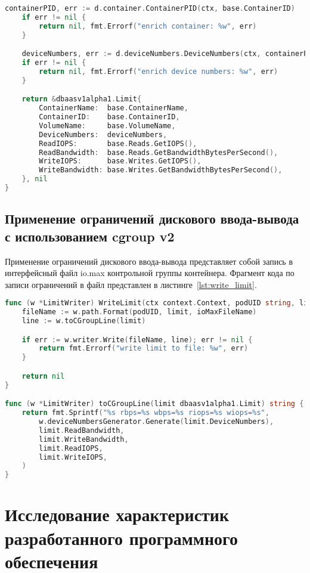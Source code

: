 \begin{lstlisting}[language=Go,label=lst:podiolimit_gen, caption={Генерация PodIOLimit}]
	containerPID, err := d.container.ContainerPID(ctx, base.ContainerID)
	if err != nil {
		return nil, fmt.Errorf("enrich container: %w", err)
	}

	deviceNumbers, err := d.deviceNumbers.DeviceNumbers(ctx, containerPID, volumeHandle)
	if err != nil {
		return nil, fmt.Errorf("enrich device numbers: %w", err)
	}

	return &dbaasv1alpha1.Limit{
		ContainerName:  base.ContainerName,
		ContainerID:    base.ContainerID,
		VolumeName:     base.VolumeName,
		DeviceNumbers:  deviceNumbers,
		ReadIOPS:       base.Reads.GetIOPS(),
		ReadBandwidth:  base.Reads.GetBandwidthBytesPerSecond(),
		WriteIOPS:      base.Writes.GetIOPS(),
		WriteBandwidth: base.Writes.GetBandwidthBytesPerSecond(),
	}, nil
}
\end{lstlisting}

\subsection{Применение ограничений дискового ввода-вывода с использованием cgroup v2}

Применение ограничений дискового ввода-вывода представляет собой запись в интерфейсный файл io.max контрольной группы контейнера. Фрагмент кода по записи ограничений в файл представлен в листинге~\ref{lst:write_limit}.

\begin{lstlisting}[language=Go,label=lst:write_limit, caption={Запись ограничений в cgroup v2}]
func (w *LimitWriter) WriteLimit(ctx context.Context, podUID string, limit dbaasv1alpha1.Limit) error {
	fileName := w.path.Format(podUID, limit, ioMaxFileName)
	line := w.toCGroupLine(limit)

	if err := w.writer.Write(fileName, line); err != nil {
		return fmt.Errorf("write limit to file: %w", err)
	}

	return nil
}

func (w *LimitWriter) toCGroupLine(limit dbaasv1alpha1.Limit) string {
	return fmt.Sprintf("%s rbps=%s wbps=%s riops=%s wiops=%s",
		w.deviceNumbersGenerator.Generate(limit.DeviceNumbers),
		limit.ReadBandwidth,
		limit.WriteBandwidth,
		limit.ReadIOPS,
		limit.WriteIOPS,
	)
}
\end{lstlisting}

\section{Исследование характеристик разработанного программного обеспечения}

